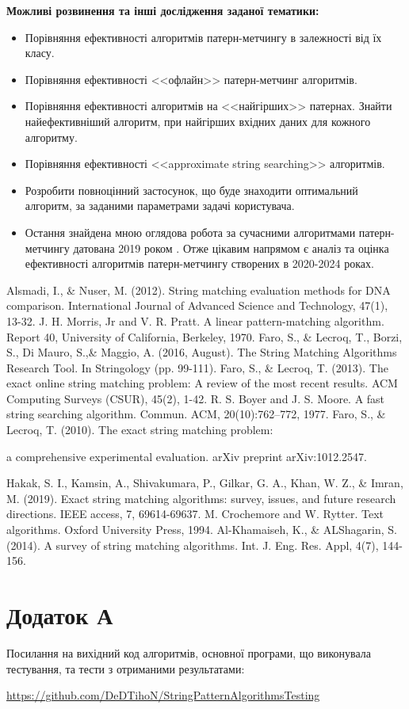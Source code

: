 \documentclass[a4paper,14pt]{extarticle} %
\begin{document}
	\textbf{Можливі розвинення та інші дослідження заданої тематики:}
	\begin{itemize}
		\item Порівняння ефективності алгоритмів патерн-метчингу в залежності від їх класу.
		\item Порівняння ефективності <<офлайн>> патерн-метчинг алгоритмів.
		\item Порівняння ефективності алгоритмів на <<найгірших>> патернах. Знайти найефективніший алгоритм, при найгірших вхідних даних для кожного алгоритму.
		\item Порівняння ефективності <<approximate string searching>> алгоритмів.
		\item Розробити повноцінний застосунок, що буде знаходити оптимальний алгоритм, за заданими параметрами задачі користувача.
		\item Остання знайдена мною оглядова робота за сучасними алгоритмами патерн-метчингу датована 2019 роком \cite{2019survey}. Отже цікавим напрямом є аналіз та оцінка ефективності алгоритмів патерн-метчингу створених в 2020-2024 роках.
	\end{itemize}

    \newpage
    
    \begin{thebibliography}{9}
		Alsmadi, I., \& Nuser, M. (2012). String matching evaluation methods for DNA comparison. International Journal of Advanced Science and Technology, 47(1), 13-32.
		J. H. Morris, Jr and V. R. Pratt. A linear pattern-matching algorithm. Report 40, University of California, Berkeley, 1970.
		Faro, S., \& Lecroq, T., Borzi, S., Di Mauro, S.,\& Maggio, A. (2016, August). The String Matching Algorithms Research Tool. In Stringology (pp. 99-111).
		Faro, S., \& Lecroq, T. (2013). The exact online string matching problem: A review of the most recent results. ACM Computing Surveys (CSUR), 45(2), 1-42.
		R. S. Boyer and J. S. Moore. A fast string searching algorithm. Commun.
ACM, 20(10):762–772, 1977.
		Faro, S., \& Lecroq, T. (2010). The exact string matching problem:
		
		a comprehensive experimental evaluation. arXiv preprint arXiv:1012.2547.

		Hakak, S. I., Kamsin, A., Shivakumara, P., Gilkar, G. A., Khan, W. Z., \& Imran, M. (2019). Exact string matching algorithms: survey, issues, and future research directions. IEEE access, 7, 69614-69637.
		M. Crochemore and W. Rytter. Text algorithms. Oxford University Press,
1994.
		Al-Khamaiseh, K., \& ALShagarin, S. (2014). A survey of string matching algorithms. Int. J. Eng. Res. Appl, 4(7), 144-156.

    \end{thebibliography}
    
	\newpage

	\section*{Додаток А}

	Посилання на вихідний код алгоритмів, основної програми, що виконувала тестування, та тести з отриманими результатами:

	\small{\url{https://github.com/DeDTihoN/StringPatternAlgorithmsTesting}}
\end{document}
